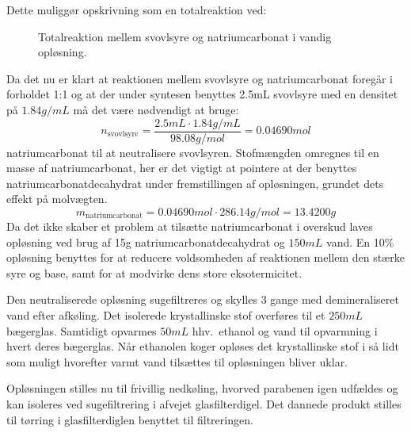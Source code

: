    Dette muliggør opskrivning som en totalreaktion ved:
    \begin{figure}[H]
        \caption{Totalreaktion mellem svovlsyre og natriumcarbonat i vandig opløsning.}
    \end{figure}
    Da det nu er klart at reaktionen mellem svovlsyre og natriumcarbonat foregår i forholdet 1:1 og at der under syntesen benyttes 2.5mL svovlsyre med en densitet på $1.84\si{g \per mL}$ må det være nødvendigt at bruge:
    \[
        n_{\text{svovlsyre}}=\frac{2.5\si{mL} \cdot 1.84\si{g\per mL}}{98.08\si{g\per mol}}=0.04690mol
    \]
    natriumcarbonat til at neutralisere svovlsyren. Stofmængden omregnes til en masse af natriumcarbonat, her er det vigtigt at pointere at der benyttes natriumcarbonatdecahydrat under fremstillingen af opløsningen, grundet dets effekt på molvægten.
    \[
        m_{\text{natriumcarbonat}}=0.04690\si{mol} \cdot 286.14\si{g\per mol}=13.4200\si{g}
    \]
    Da det ikke skaber et problem at tilsætte natriumcarbonat i overskud laves opløsning ved brug af 15g natriumcarbonatdecahydrat og $150\si{mL}$ vand. En 10\% opløsning benyttes for at reducere voldsomheden af reaktionen mellem den stærke syre og base, samt for at modvirke dens store eksotermicitet.

    Den neutraliserede opløsning sugefiltreres og skylles 3 gange med demineraliseret vand efter afkøling. Det isolerede krystallinske stof overføres til et $250\si{mL}$ bægerglas. Samtidigt opvarmes $50\si{mL}$ hhv.\ ethanol og vand til opvarmning i hvert deres bægerglas. Når ethanolen koger opløses det krystallinske stof i så lidt som muligt hvorefter varmt vand tilsættes til opløsningen bliver uklar.

    Opløsningen stilles nu til frivillig nedkøling, hvorved parabenen igen udfældes og kan isoleres ved sugefiltrering i afvejet glasfilterdigel. Det dannede produkt stilles til tørring i glasfilterdiglen benyttet til filtreringen.


